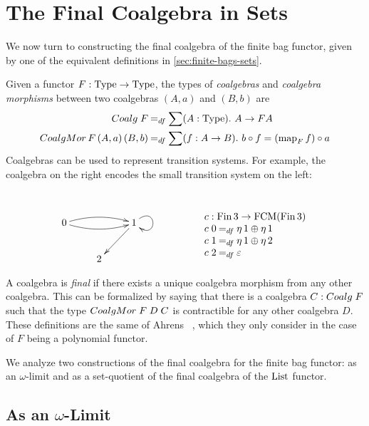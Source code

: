\documentclass[final,a4paper,USenglish,cleveref]{lipics-v2021}
\begin{document}
\section{The Final Coalgebra in Sets}\label{sec:final-coalgebra-sets}

We now turn to constructing the final coalgebra of the finite bag functor, given by one of the equivalent definitions in \cref{sec:finite-bags-sets}. %

Given a functor $F : \Type \to \Type$, the types of \emph{coalgebras}
and \emph{coalgebra morphisms} between two coalgebras $(A,a)$ and
$(B,b)$ are
\begin{align*}
  \Coalg\;F &\DefEq \sum (A : \Type) \Where A \to F A \\
  \CoalgMor\,F\,(A,a)\,(B,b) &\DefEq \sum (f : A \to B) \Where b \circ f = (\Map{F} f) \circ a
\end{align*}
Coalgebras can be used to represent transition systems. For example, the coalgebra on the right encodes the small transition system on the left:
\vspace{-.8cm}
\[
\begin{array}{c@{\qquad\qquad\qquad}c}
\xymatrix{
  0 \ar@/^/[rr] \ar@/_/[rr] & & 1 \ar[dl] \ar@(ur,dr) \\
  & 2 &
}
&
\begin{array}{l}
  \\ \\
  c : \Fin 3 \to \FCM (\Fin 3) \\
  c \; 0 \DefEq \Singl 1 \Union \Singl 1 \\
  c \; 1 \DefEq \Singl 1 \Union \Singl 2 \\
  c \; 2 \DefEq \Empty
\end{array}
\end{array}
\]

A coalgebra is \emph{final} if there exists a unique coalgebra morphism from any other coalgebra. This can be formalized by saying that there is a coalgebra $C : \Coalg\;F$ such that the type $\CoalgMor\;F\;D\;C$ is contractible for any other coalgebra $D$. These definitions are the same of Ahrens \etal~\cite{Ahrens2015}, which they only consider in the case of $F$ being a polynomial functor.

We analyze two constructions of the final coalgebra for the finite bag functor: as an $\omega$-limit
and as a set-quotient of the final coalgebra of the $\List$ functor.

\subsection{As an \texorpdfstring{\ensuremath{\omega}}{ω}-Limit}\label{sec:final-limit-set}
\end{document}
